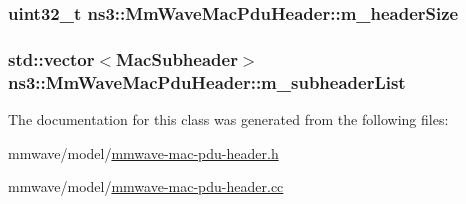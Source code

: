 \subsubsection[{\texorpdfstring{m\+\_\+header\+Size}{m_headerSize}}]{\setlength{\rightskip}{0pt plus 5cm}uint32\+\_\+t ns3\+::\+Mm\+Wave\+Mac\+Pdu\+Header\+::m\+\_\+header\+Size\hspace{0.3cm}{\ttfamily [protected]}}\hypertarget{classns3_1_1MmWaveMacPduHeader_ae473a43cc08ab2a1c7b9cb876c2642e8}{}\label{classns3_1_1MmWaveMacPduHeader_ae473a43cc08ab2a1c7b9cb876c2642e8}
\subsubsection[{\texorpdfstring{m\+\_\+subheader\+List}{m_subheaderList}}]{\setlength{\rightskip}{0pt plus 5cm}std\+::vector$<${\bf Mac\+Subheader}$>$ ns3\+::\+Mm\+Wave\+Mac\+Pdu\+Header\+::m\+\_\+subheader\+List\hspace{0.3cm}{\ttfamily [protected]}}\hypertarget{classns3_1_1MmWaveMacPduHeader_a7eee94275aa3be87d89481dc90c1787c}{}\label{classns3_1_1MmWaveMacPduHeader_a7eee94275aa3be87d89481dc90c1787c}


The documentation for this class was generated from the following files\+:\begin{DoxyCompactItemize}
\item 
mmwave/model/\hyperlink{mmwave-mac-pdu-header_8h}{mmwave-\/mac-\/pdu-\/header.\+h}\item 
mmwave/model/\hyperlink{mmwave-mac-pdu-header_8cc}{mmwave-\/mac-\/pdu-\/header.\+cc}\end{DoxyCompactItemize}
